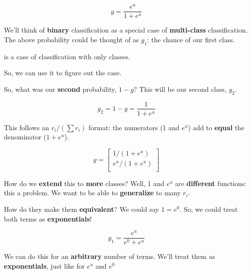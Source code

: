         \begin{equation}
            g = \frac{e^u}{1+e^u}
        \end{equation}
        
        We'll think of \textbf{binary} classification as a special case of \textbf{multi-class} classification. The above probability could be thought of as $g_1$: the chance of our first class.\\
        
        \begin{concept}
             is a  case of  classification with only  classes. 
            
            So, we can use it to figure out the  case.
        \end{concept}
        
        So, what was our \textbf{second} probability, $1-g$? This will be our second class, $g_2$.
        
        \begin{equation}
            g_2 = 1-g= \frac{1}{1+e^{u}}
        \end{equation}
        
        This follows an $r_i/(\sum r_i)$ format: the numerators (1 and $e^u$) add to \textbf{equal} the denominator ($1+e^u$).
        
        \begin{equation}
            g = 
            \begin{bmatrix}
                1/(1+e^u)  \\
                e^u/(1+e^u)  \\
            \end{bmatrix}
        \end{equation}
        
        How do we \textbf{extend} this to \textbf{more} classes? Well, 1 and $e^u$ are \textbf{different} functions: this a problem. We want to be able to \textbf{generalize} to many $r_i$. 
        
        How do they make them \textbf{equivalent}? We could say $1=e^0$. So, we could treat both terms as \textbf{exponentials}!
        
        \begin{equation}
            g_1 = \frac{e^u}{e^0+e^u}
        \end{equation}
        
        We can do this for an \textbf{arbitrary} number of terms. We'll treat them as \textbf{exponentials}, just like for $e^u$ and $e^0$
        
